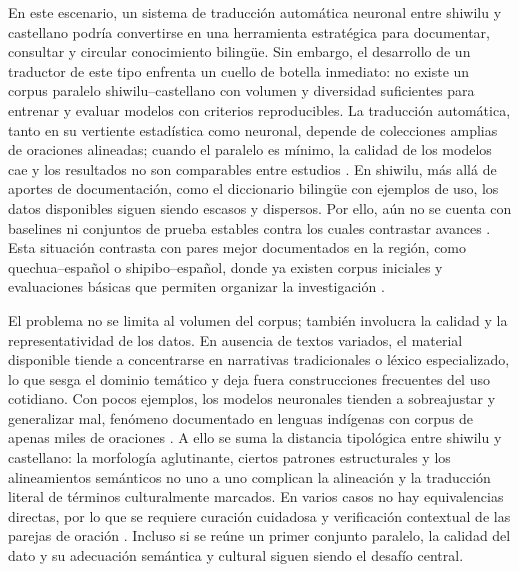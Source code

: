 \documentclass[12pt,a4paper,oneside]{book}
\begin{document}
En este escenario, un sistema de traducción automática neuronal entre shiwilu y castellano podría convertirse en una herramienta estratégica para documentar, consultar y circular conocimiento bilingüe. Sin embargo, el desarrollo de un traductor de este tipo enfrenta un cuello de botella inmediato: no existe un corpus paralelo shiwilu--castellano con volumen y diversidad suficientes para entrenar y evaluar modelos con criterios reproducibles. La traducción automática, tanto en su vertiente estadística como neuronal, depende de colecciones amplias de oraciones alineadas; cuando el paralelo es mínimo, la calidad de los modelos cae y los resultados no son comparables entre estudios \parencite{mager2018}. En shiwilu, más allá de aportes de documentación, como el diccionario bilingüe con ejemplos de uso, los datos disponibles siguen siendo escasos y dispersos. Por ello, aún no se cuenta con baselines ni conjuntos de prueba estables contra los cuales contrastar avances \parencite{valenzuela2018}. Esta situación contrasta con pares mejor documentados en la región, como quechua--español o shipibo--español, donde ya existen corpus iniciales y evaluaciones básicas que permiten organizar la investigación \parencite{galarreta2017,chuquimamani2021}.

El problema no se limita al volumen del corpus; también involucra la calidad y la representatividad de los datos. En ausencia de textos variados, el material disponible tiende a concentrarse en narrativas tradicionales o léxico especializado, lo que sesga el dominio temático y deja fuera construcciones frecuentes del uso cotidiano. Con pocos ejemplos, los modelos neuronales tienden a sobreajustar y generalizar mal, fenómeno documentado en lenguas indígenas con corpus de apenas miles de oraciones \parencite{mager2018}. A ello se suma la distancia tipológica entre shiwilu y castellano: la morfología aglutinante, ciertos patrones estructurales y los alineamientos semánticos no uno a uno complican la alineación y la traducción literal de términos culturalmente marcados. En varios casos no hay equivalencias directas, por lo que se requiere curación cuidadosa y verificación contextual de las parejas de oración \parencite{ministeriodecultura2016}. Incluso si se reúne un primer conjunto paralelo, la calidad del dato y su adecuación semántica y cultural siguen siendo el desafío central.
\end{document}
